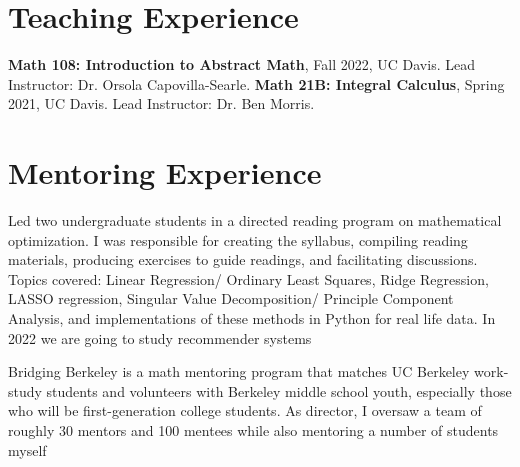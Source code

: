 \documentclass[11pt,letter]{moderncv}
\begin{document}
\section{Teaching Experience}
\vspace{0.05in}
{\textbf{Math 108: Introduction to Abstract Math}, Fall 2022, UC Davis. Lead Instructor: Dr. Orsola Capovilla-Searle.}
\cvitem{}
{\textbf{Math 21B: Integral Calculus}, Spring 2021, UC Davis. Lead Instructor: Dr. Ben Morris.}
\vspace{0.05in}
\vspace{0.05in}
\vspace{0.05in}
\vspace{0.05in}

\section{Mentoring Experience}
\vspace{0.05in}
\begin{itemize}
 {Led two undergraduate students in a directed reading program on mathematical optimization.  I was responsible for creating the syllabus, compiling reading materials, producing exercises to guide readings, and facilitating discussions. Topics covered: Linear Regression/ Ordinary Least Squares, Ridge Regression, LASSO regression, Singular Value Decomposition/ Principle Component Analysis, and implementations of these methods in Python for real life data. In 2022 we are going to study recommender systems}{}{}{}{}
\end{itemize}
\vspace{0.05in}
\begin{itemize}
 {Bridging Berkeley is a math mentoring program that matches UC Berkeley work-study students and volunteers with Berkeley middle school youth, especially those who will be first-generation college students. As director, I oversaw a team of roughly 30 mentors and 100 mentees while also mentoring a number of students myself}{}{}{}{}
\end{itemize}
\vspace{0.05in}
\end{document}
